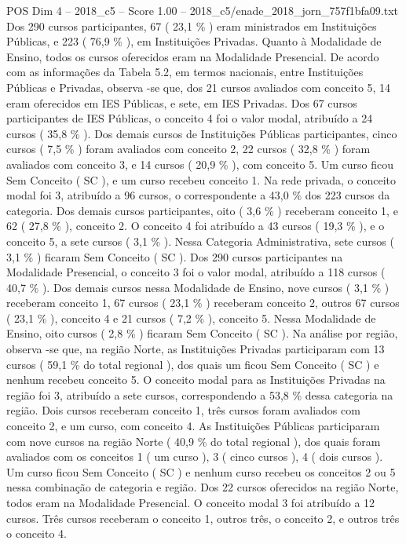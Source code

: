 \begin{textsample}{POS Dim 4 – 2018\_c5 – Score 1.00 – 2018\_c5/enade\_2018\_jorn\_757f1bfa09.txt}
Dos 290 cursos participantes, 67 ( 23,1 \% ) eram ministrados em Instituições Públicas, e 223 ( 76,9 \% ), em Instituições Privadas.
Quanto à Modalidade de Ensino, todos os cursos oferecidos eram na Modalidade Presencial.
De acordo com as informações da Tabela 5.2, em termos nacionais, entre Instituições Públicas e Privadas, observa -se que, dos 21 cursos avaliados com conceito 5, 14 eram oferecidos em IES Públicas, e sete, em IES Privadas.
Dos 67 cursos participantes de IES Públicas, o conceito 4 foi o valor modal, atribuído a 24 cursos ( 35,8 \% ).
Dos demais cursos de Instituições Públicas participantes, cinco cursos ( 7,5 \% ) foram avaliados com conceito 2, 22 cursos ( 32,8 \% ) foram avaliados com conceito 3, e 14 cursos ( 20,9 \% ), com conceito 5.
Um curso ficou Sem Conceito ( SC ), e um curso recebeu conceito 1.
Na rede privada, o conceito modal foi 3, atribuído a 96 cursos, o correspondente a 43,0 \% dos 223 cursos da categoria.
Dos demais cursos participantes, oito ( 3,6 \% ) receberam conceito 1, e 62 ( 27,8 \% ), conceito 2.
O conceito 4 foi atribuído a 43 cursos ( 19,3 \% ), e o conceito 5, a sete cursos ( 3,1 \% ).
Nessa Categoria Administrativa, sete cursos ( 3,1 \% ) ficaram Sem Conceito ( SC ).
Dos 290 cursos participantes na Modalidade Presencial, o conceito 3 foi o valor modal, atribuído a 118 cursos ( 40,7 \% ).
Dos demais cursos nessa Modalidade de Ensino, nove cursos ( 3,1 \% ) receberam conceito 1, 67 cursos ( 23,1 \% ) receberam conceito 2, outros 67 cursos ( 23,1 \% ), conceito 4 e 21 cursos ( 7,2 \% ), conceito 5.
Nessa Modalidade de Ensino, oito cursos ( 2,8 \% ) ficaram Sem Conceito ( SC ).
Na análise por região, observa -se que, na região Norte, as Instituições Privadas participaram com 13 cursos ( 59,1 \% do total regional ), dos quais um ficou Sem Conceito ( SC ) e nenhum recebeu conceito 5.
O conceito modal para as Instituições Privadas na região foi 3, atribuído a sete cursos, correspondendo a 53,8 \% dessa categoria na região.
Dois cursos receberam conceito 1, três cursos foram avaliados com conceito 2, e um curso, com conceito 4.
As Instituições Públicas participaram com nove cursos na região Norte ( 40,9 \% do total regional ), dos quais foram avaliados com os conceitos 1 ( um curso ), 3 ( cinco cursos ), 4 ( dois cursos ).
Um curso ficou Sem Conceito ( SC ) e nenhum curso recebeu os conceitos 2 ou 5 nessa combinação de categoria e região.
Dos 22 cursos oferecidos na região Norte, todos eram na Modalidade Presencial.
O conceito modal 3 foi atribuído a 12 cursos.
Três cursos receberam o conceito 1, outros três, o conceito 2, e outros três o conceito 4.

\end{textsample}
